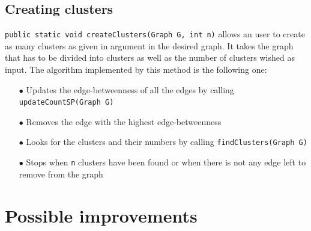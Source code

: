 \documentclass{article}
\begin{document}
\subsection{Creating clusters}

\texttt{public static void createClusters(Graph G, int n)} allows an user to create as many clusters as given in argument in the desired graph. It takes the graph that has to be divided into clusters as well as the number of clusters wished as input.
The algorithm implemented by this method is the following one:

\begin{itemize}
\item[$\bullet$] Updates the edge-betweenness of all the edges by calling \texttt{updateCountSP(Graph G)}
\item[$\bullet$] Removes the edge with the highest edge-betweenness
\item[$\bullet$] Looks for the clusters and their numbers by calling \texttt{findClusters(Graph G)}
\item[$\bullet$] Stops when \texttt{n} clusters have been found or when there is not any edge left to remove from the graph
\end{itemize}

\newpage

\section{Possible improvements}
\end{document}
